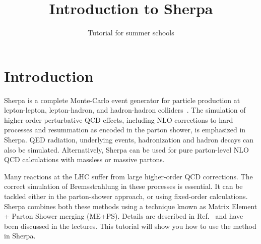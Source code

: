 \documentclass[10pt]{article}
\begin{document}
\title{{\Huge\bf Introduction to Sherpa}}
\author{{\Large Tutorial for summer schools}}
\date{}
\maketitle

\section{Introduction}

Sherpa is a complete Monte-Carlo event generator for particle production at
lepton-lepton, lepton-hadron, and hadron-hadron colliders~\cite{Gleisberg:2008ta}.
The simulation of higher-order perturbative QCD effects, including NLO corrections 
to hard processes and resummation as encoded in the parton shower, is emphasized 
in Sherpa. QED radiation, underlying events, hadronization and hadron decays can
also be simulated. Alternatively, Sherpa can be used for pure parton-level NLO QCD 
calculations with massless or massive partons.

Many reactions at the LHC suffer from large higher-order QCD corrections.
The correct simulation of Bremsstrahlung in these processes is essential. It can 
be tackled either in the parton-shower approach, or using fixed-order calculations.
Sherpa combines both these methods using a technique known as Matrix Element + 
Parton Shower merging (ME+PS). Details are described in Ref.~\cite{Buckley:2011ms}
and have been discussed in the lectures. This tutorial will show
you how to use the method in Sherpa.
\end{document}
